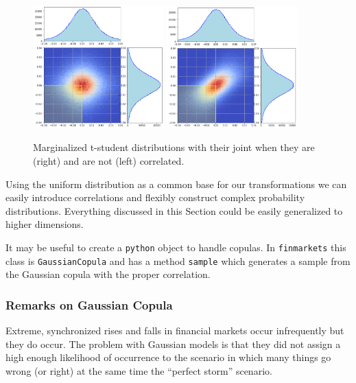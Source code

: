 \begin{figure}[htbp]
\centering
\includegraphics[width=0.45\textwidth]{figures/bmw_sie_uncorrelated}
\quad
\includegraphics[width=0.45\textwidth]{figures/bmw_sie_correlated}
\caption{Marginalized t-student distributions with their joint when they are (right) and are not (left) correlated.}
\label{fig:bmw_sie_with_corr}
\end{figure}
    
Using the uniform distribution as a common base for our transformations we can easily introduce correlations and flexibly construct complex probability distributions. Everything discussed in this Section could be easily generalized to higher dimensions.

\begin{finmarkets}
It may be useful to create a \texttt{python} object to handle copulas. In \texttt{finmarkets} this class is \texttt{GaussianCopula} and has a method \texttt{sample} which generates a sample from the Gaussian copula with the proper correlation.
\end{finmarkets}


\subsubsection{Remarks on Gaussian Copula}
Extreme, synchronized rises and falls in financial markets occur infrequently but they do occur. The problem with Gaussian models is that they did not assign a high enough likelihood of occurrence to the scenario in which many things go wrong (or right) at the same time the “perfect storm” scenario.

